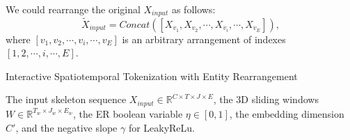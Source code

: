 \documentclass[letterpaper, 10 pt, conference]{ieeeconf}
\begin{document}
We could rearrange the original $X_{input}$ as follows:
\begin{equation}
    \tilde{X}_{input} = Concat([X_{v_1}, X_{v_2},\cdots, X_{v_i},\cdots, X_{v_E}]),
\end{equation}
where $[v_{1}, v_{2},\cdots, v_{i},\cdots, v_{E}]$ is an arbitrary arrangement of indexes $[1, 2,\cdots, i,\cdots, E]$.

\begin{algorithm}[t]
\renewcommand{\algorithmicrequire}{\textbf{Input:}}
	\renewcommand{\algorithmicensure}{\textbf{Output:}}
	\caption{Interactive Spatiotemporal Tokenization with Entity Rearrangement}  
	\label{tokenize}
	\begin{algorithmic}[1]
 	    \Require The input skeleton sequence $X_{input} \in \mathbb{R}^{C\times T\times J \times E}$, the 3D sliding windows $W \in \mathbb{R}^{T_{w}\times J_{w} \times E_{w}}$, the ER boolean variable $\eta \in [0, 1]$, the embedding dimension $C'$, and the negative slope $\gamma$ for LeakyReLu.
		\If{$\eta$}
		\Else
		\EndIf
        
	\end{algorithmic}
\end{algorithm}
\end{document}
